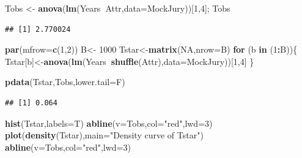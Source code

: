 \documentclass[]{book}
\newenvironment{Shaded}{\begin{snugshade}}{\end{snugshade}}
\newcommand{\KeywordTok}[1]{\textcolor[rgb]{0.13,0.29,0.53}{\textbf{#1}}}
\newcommand{\DataTypeTok}[1]{\textcolor[rgb]{0.13,0.29,0.53}{#1}}
\newcommand{\DecValTok}[1]{\textcolor[rgb]{0.00,0.00,0.81}{#1}}
\newcommand{\StringTok}[1]{\textcolor[rgb]{0.31,0.60,0.02}{#1}}
\newcommand{\OtherTok}[1]{\textcolor[rgb]{0.56,0.35,0.01}{#1}}
\newcommand{\ControlFlowTok}[1]{\textcolor[rgb]{0.13,0.29,0.53}{\textbf{#1}}}
\newcommand{\OperatorTok}[1]{\textcolor[rgb]{0.81,0.36,0.00}{\textbf{#1}}}
\newcommand{\NormalTok}[1]{#1}
\begin{document}
\begin{Shaded}
\begin{Highlighting}[]
\NormalTok{Tobs <-}\StringTok{ }\KeywordTok{anova}\NormalTok{(}\KeywordTok{lm}\NormalTok{(Years}\OperatorTok{~}\NormalTok{Attr,}\DataTypeTok{data=}\NormalTok{MockJury))[}\DecValTok{1}\NormalTok{,}\DecValTok{4}\NormalTok{]; Tobs}
\end{Highlighting}
\end{Shaded}

\begin{verbatim}
## [1] 2.770024
\end{verbatim}

\begin{Shaded}
\begin{Highlighting}[]
\KeywordTok{par}\NormalTok{(}\DataTypeTok{mfrow=}\KeywordTok{c}\NormalTok{(}\DecValTok{1}\NormalTok{,}\DecValTok{2}\NormalTok{))}
\NormalTok{B<-}\StringTok{ }\DecValTok{1000}
\NormalTok{Tstar<-}\KeywordTok{matrix}\NormalTok{(}\OtherTok{NA}\NormalTok{,}\DataTypeTok{nrow=}\NormalTok{B)}
\ControlFlowTok{for}\NormalTok{ (b }\ControlFlowTok{in}\NormalTok{ (}\DecValTok{1}\OperatorTok{:}\NormalTok{B))\{}
\NormalTok{  Tstar[b]<-}\KeywordTok{anova}\NormalTok{(}\KeywordTok{lm}\NormalTok{(Years}\OperatorTok{~}\KeywordTok{shuffle}\NormalTok{(Attr),}\DataTypeTok{data=}\NormalTok{MockJury))[}\DecValTok{1}\NormalTok{,}\DecValTok{4}\NormalTok{]}
\NormalTok{\}}

\KeywordTok{pdata}\NormalTok{(Tstar,Tobs,}\DataTypeTok{lower.tail=}\NormalTok{F)}
\end{Highlighting}
\end{Shaded}

\begin{verbatim}
## [1] 0.064
\end{verbatim}

\begin{Shaded}
\begin{Highlighting}[]
\KeywordTok{hist}\NormalTok{(Tstar,}\DataTypeTok{labels=}\NormalTok{T)}
\KeywordTok{abline}\NormalTok{(}\DataTypeTok{v=}\NormalTok{Tobs,}\DataTypeTok{col=}\StringTok{"red"}\NormalTok{,}\DataTypeTok{lwd=}\DecValTok{3}\NormalTok{)}
\KeywordTok{plot}\NormalTok{(}\KeywordTok{density}\NormalTok{(Tstar),}\DataTypeTok{main=}\StringTok{"Density curve of Tstar"}\NormalTok{)}
\KeywordTok{abline}\NormalTok{(}\DataTypeTok{v=}\NormalTok{Tobs,}\DataTypeTok{col=}\StringTok{"red"}\NormalTok{,}\DataTypeTok{lwd=}\DecValTok{3}\NormalTok{)}
\end{Highlighting}
\end{Shaded}
\end{document}
